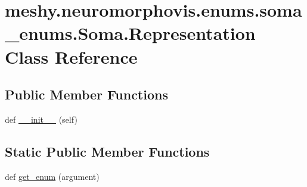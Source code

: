 \hypertarget{classmeshy_1_1neuromorphovis_1_1enums_1_1soma__enums_1_1Soma_1_1Representation}{}\section{meshy.\+neuromorphovis.\+enums.\+soma\+\_\+enums.\+Soma.\+Representation Class Reference}
\label{classmeshy_1_1neuromorphovis_1_1enums_1_1soma__enums_1_1Soma_1_1Representation}


 


\subsection*{Public Member Functions}
\begin{DoxyCompactItemize}
\item 
def \hyperlink{classmeshy_1_1neuromorphovis_1_1enums_1_1soma__enums_1_1Soma_1_1Representation_aa8219d7d7ddde3d9bdfc6ae72283ca0c}{\+\_\+\+\_\+init\+\_\+\+\_\+} (self)\hypertarget{classmeshy_1_1neuromorphovis_1_1enums_1_1soma__enums_1_1Soma_1_1Representation_aa8219d7d7ddde3d9bdfc6ae72283ca0c}{}\label{classmeshy_1_1neuromorphovis_1_1enums_1_1soma__enums_1_1Soma_1_1Representation_aa8219d7d7ddde3d9bdfc6ae72283ca0c}

\end{DoxyCompactItemize}
\subsection*{Static Public Member Functions}
\begin{DoxyCompactItemize}
\item 
def \hyperlink{classmeshy_1_1neuromorphovis_1_1enums_1_1soma__enums_1_1Soma_1_1Representation_af3213653cb261a5b89b8cb6426aefb82}{get\+\_\+enum} (argument)
\end{DoxyCompactItemize}
